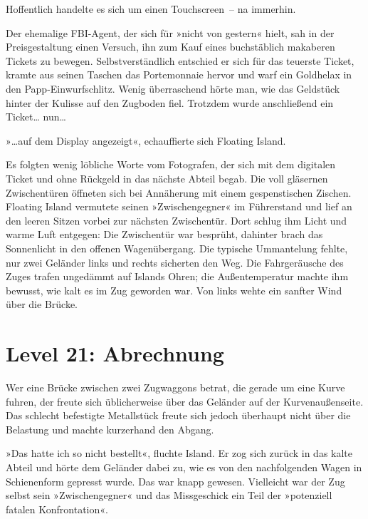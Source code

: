 
Hoffentlich handelte es sich um einen Touchscreen~– na immerhin.


Der ehemalige FBI-Agent, der sich für »nicht von gestern« hielt, sah in der Preisgestaltung einen Versuch, ihn zum Kauf eines buchstäblich makaberen Tickets zu bewegen. Selbstverständlich entschied er sich für das teuerste Ticket, kramte aus seinen Taschen das Portemonnaie hervor und warf ein Goldhelax in den Papp-Einwurfschlitz. Wenig überraschend hörte man, wie das Geldstück hinter der Kulisse auf den Zugboden fiel. Trotzdem wurde anschließend ein Ticket… nun…

»…auf dem Display angezeigt«, echauffierte sich Floating Island.


Es folgten wenig löbliche Worte vom Fotografen, der sich mit dem digitalen Ticket und ohne Rückgeld in das nächste Abteil begab. Die voll gläsernen Zwischentüren öffneten sich bei Annäherung mit einem gespenstischen Zischen. Floating Island vermutete seinen »Zwischengegner« im Führerstand und lief an den leeren Sitzen vorbei zur nächsten Zwischentür. Dort schlug ihm Licht und warme Luft entgegen: Die Zwischentür war besprüht, dahinter brach das Sonnenlicht in den offenen Wagenübergang. Die typische Ummantelung fehlte, nur zwei Geländer links und rechts sicherten den Weg. Die Fahrgeräusche des Zuges trafen ungedämmt auf Islands Ohren; die Außentemperatur machte ihm bewusst, wie kalt es im Zug geworden war. Von links wehte ein sanfter Wind über die Brücke.

\section{Level 21: Abrechnung}

Wer eine Brücke zwischen zwei Zugwaggons betrat, die gerade um eine Kurve fuhren, der freute sich üblicherweise über das Geländer auf der Kurvenaußenseite. Das schlecht befestigte Metallstück freute sich jedoch überhaupt nicht über die Belastung und machte kurzerhand den Abgang.

»Das hatte ich so nicht bestellt«, fluchte Island. Er zog sich zurück in das kalte Abteil und hörte dem Geländer dabei zu, wie es von den nachfolgenden Wagen in Schienenform gepresst wurde. Das war knapp gewesen. Vielleicht war der Zug selbst sein »Zwischengegner« und das Missgeschick ein Teil der »potenziell fatalen Konfrontation«.

